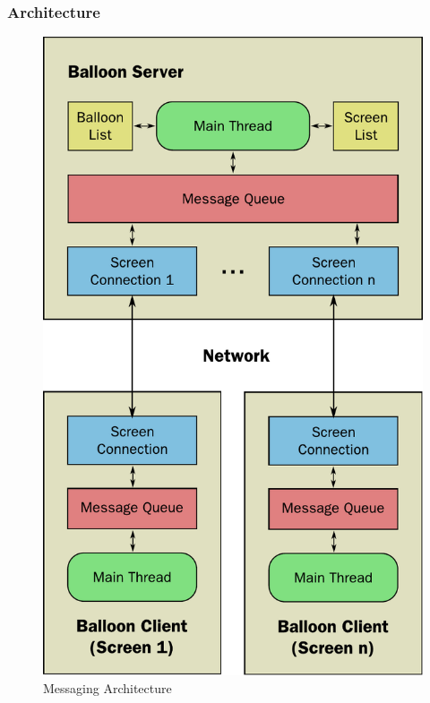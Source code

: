 \subsubsection{Architecture}

\begin{figure}
\begin{centering}
\includegraphics[scale=1.0]{Diagrams/messaging}
\par\end{centering}

\caption{Messaging Architecture}
\label{Messaging-Arch}
\end{figure}

